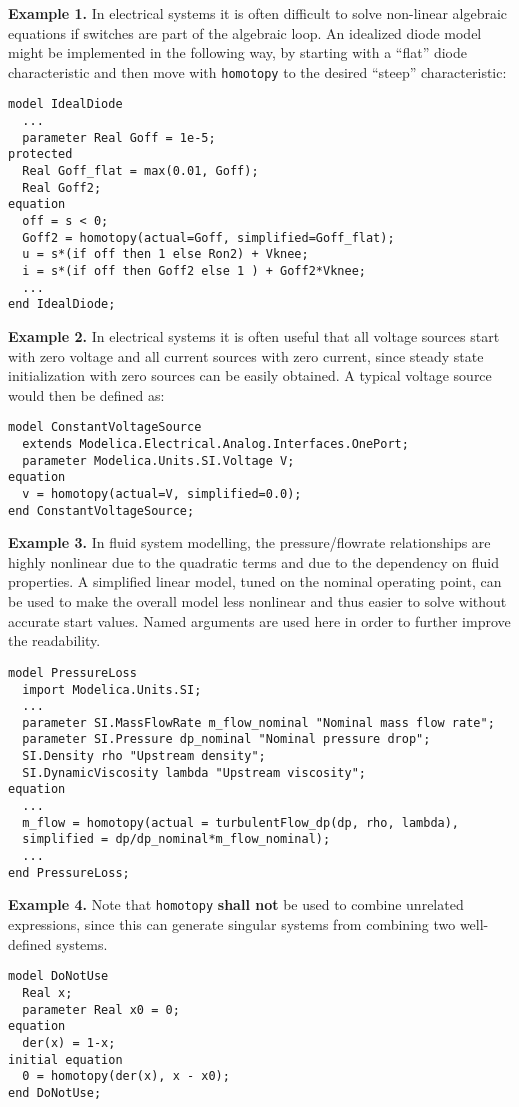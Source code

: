 \begin{nonnormative}
\textbf{Example 1.} In electrical systems it is often difficult to solve non-linear
algebraic equations if switches are part of the algebraic loop. An
idealized diode model might be implemented in the following way, by
starting with a ``flat'' diode characteristic and then move with
\lstinline!homotopy! to the desired ``steep'' characteristic:
\begin{lstlisting}[language=modelica]
model IdealDiode
  ...
  parameter Real Goff = 1e-5;
protected
  Real Goff_flat = max(0.01, Goff);
  Real Goff2;
equation
  off = s < 0;
  Goff2 = homotopy(actual=Goff, simplified=Goff_flat);
  u = s*(if off then 1 else Ron2) + Vknee;
  i = s*(if off then Goff2 else 1 ) + Goff2*Vknee;
  ...
end IdealDiode;
\end{lstlisting}

\textbf{Example 2.} In electrical systems it is often useful that all voltage sources
start with zero voltage and all current sources with zero current, since
steady state initialization with zero sources can be easily obtained. A
typical voltage source would then be defined as:
\begin{lstlisting}[language=modelica]
model ConstantVoltageSource
  extends Modelica.Electrical.Analog.Interfaces.OnePort;
  parameter Modelica.Units.SI.Voltage V;
equation
  v = homotopy(actual=V, simplified=0.0);
end ConstantVoltageSource;
\end{lstlisting}

\textbf{Example 3.} In fluid system modelling, the pressure/flowrate relationships are
highly nonlinear due to the quadratic terms and due to the dependency on
fluid properties. A simplified linear model, tuned on the nominal
operating point, can be used to make the overall model less nonlinear
and thus easier to solve without accurate start values. Named arguments
are used here in order to further improve the readability.
\begin{lstlisting}[language=modelica]
model PressureLoss
  import Modelica.Units.SI;
  ...
  parameter SI.MassFlowRate m_flow_nominal "Nominal mass flow rate";
  parameter SI.Pressure dp_nominal "Nominal pressure drop";
  SI.Density rho "Upstream density";
  SI.DynamicViscosity lambda "Upstream viscosity";
equation
  ...
  m_flow = homotopy(actual = turbulentFlow_dp(dp, rho, lambda),
  simplified = dp/dp_nominal*m_flow_nominal);
  ...
end PressureLoss;
\end{lstlisting}

\textbf{Example 4.} Note that \lstinline!homotopy! \textbf{shall not} be used to
combine unrelated expressions, since this can generate singular systems
from combining two well-defined systems.
\begin{lstlisting}[language=modelica]
model DoNotUse
  Real x;
  parameter Real x0 = 0;
equation
  der(x) = 1-x;
initial equation
  0 = homotopy(der(x), x - x0);
end DoNotUse;
\end{lstlisting}


\end{nonnormative}

